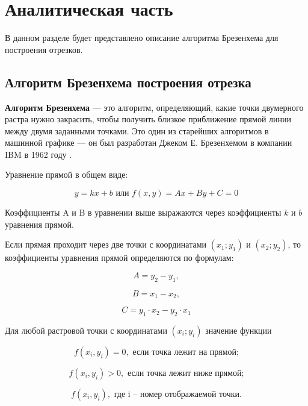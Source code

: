 \chapter{Аналитическая часть}
В данном разделе будет представлено описание алгоритма Брезенхема для построения отрезков.

\section{Алгоритм Брезенхема построения отрезка}
\textbf{Алгоритм Брезенхема} --- это алгоритм, определяющий, какие точки двумерного растра нужно закрасить, чтобы получить близкое приближение прямой линии между двумя заданными точками. Это один из старейших алгоритмов в машинной графике --- он был разработан Джеком Е. Брезенхемом в компании IBM в 1962 году \cite{brez_def}.

Уравнение прямой в общем виде:

\begin{equation}
	y=kx+b \text{ или } f(x,y)=Ax+By+C=0
\end{equation}

Коэффициенты A и B в уравнении выше выражаются через коэффициенты $k$ и $b$ уравнения прямой.

Если прямая проходит через две точки с координатами $(x_{1};y_{1})$ и $(x_{2};y_{2})$, то коэффициенты уравнения прямой определяются по формулам:

\begin{equation}
	A=y_{2}-y_{1},
\end{equation}

\begin{equation}
	B=x_{1}-x_{2},
\end{equation}

\begin{equation}
	C=y_{1} \cdot x_{2}-y_{2} \cdot x_{1}
\end{equation}

Для любой растровой точки с координатами $(x_{i};y_{i})$ значение функции

\begin{equation}
	f(x_{i},y_{i}) = 0, \text{ если точка лежит на прямой;}
\end{equation}

\begin{equation}
	f(x_{i},y_{i}) > 0, \text{ если точка лежит ниже прямой;}
\end{equation}
	
\begin{equation}
	f(x_{i},y_{i}), \text{ где i – номер отображаемой точки.}
\end{equation}

